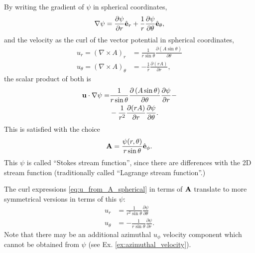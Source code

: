 By writing the gradient of $\psi$ in spherical coordinates,
\[
\nabla \psi =
{\partial \psi \over  \partial r} \hat{\mathbf{e}}_r +
\frac1r {\partial \psi \over  \partial \theta} \hat{\mathbf{e}}_\theta ,
\]
and the velocity as the curl of the vector potential in spherical coordinates,
\begin{align}
\label{eq:u_from_A_spherical}
u_r = (\nabla\times A)_r    
&=  \frac {1}{r\sin \theta }
\frac{ \partial  \left( A  \sin \theta \right) }{\partial \theta }  \\
u_\theta = (\nabla\times A)_\theta
&= - \frac1{r} \frac{\partial (rA) }{\partial r} ,
\end{align}
the scalar product of both is
\begin{align*}
\mathbf{u}\cdot\nabla\psi  =
& \frac{1}{r\sin \theta }
\frac{ \partial  \left( A  \sin \theta \right) }{\partial \theta }
{\partial \psi \over  \partial r} - \\
& -
\frac1{r^2} \frac{\partial (rA) }{\partial r}
{\partial \psi \over  \partial \theta} .
\end{align*}
%
This is satisfied with the choice
\begin{equation}
  \label{eq:Stokes_stream_spherical}
  \mathbf{A} = \frac{\psi(r,\theta)}{r \sin\theta } \hat{\mathbf{e}}_\phi .    
\end{equation}
%
This $\psi$ is called ``Stokes stream function'', since there are differences with the 2D stream function
  (traditionally called ``Lagrange stream function''.)

The curl expressions \ref{eq:u_from_A_spherical} in terms of
$\mathbf{A}$ translate to more symmetrical versions in terms of this
$\psi$:
\begin{equation}
  \label{eq:u_from_psi_spherical}
  \begin{split}
    u_r     &=  \frac1{r^2 \sin\theta} \frac{\partial \psi}{\partial \theta} \\
    u_\theta &= -\frac1{r   \sin\theta} \frac{\partial \psi}{\partial r} .
  \end{split}
\end{equation}
%
Note that there may be an additional azimuthal $u_\phi$ velocity component
which cannot be obtained from $\psi$ (see Ex. \ref{ex:azimuthal_velocity}).


